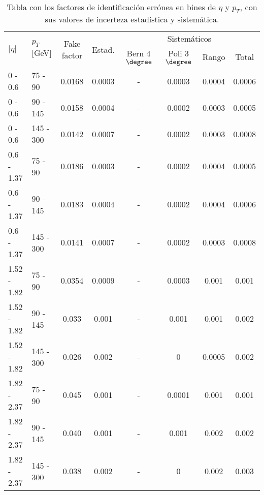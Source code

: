 \begin{table}	
\centering
\begin{threeparttable}
\caption{Tabla con los factores de identificación errónea en bines de $\eta$ y $p_{T}$, con sus valores de incerteza estadística y sistemática.}
\begin{tabular}{ l l c c c c c c }

	\hline
	\hline

	\multirow{2}{*}{$|\eta|$} & \multirow{2}{*}{$p_{T}$[GeV]} & \multirow{2}{*}{Fake factor} & \multirow{2}{*}{Estad.} & \multicolumn{4}{c}{Sistemáticos} \\

	\cline{5-8}

	 & & & & Bern 4$\degree$ & Poli 3$\degree$ & Rango & Total \\


	\hline

	0 - 0.6 & 75 - 90 & 0.0168 & 0.0003 & -			& 0.0003  &  0.0004 &  0.0006  \\

	0 - 0.6 & 90 - 145 & 0.0158 & 0.0004 & - 		& 0.0002  &  0.0003 &  0.0005  \\

	0 - 0.6 & 145 - 300 & 0.0142 & 0.0007 & -  		& 0.0002  &  0.0003 &  0.0008  \\

	\hline

	0.6 - 1.37 & 75 - 90 & 0.0186 & 0.0003 & -		& 0.0002  &  0.0004 &  0.0005  \\

	0.6 - 1.37 & 90 - 145 & 0.0183 & 0.0004 & -		& 0.0002  &  0.0004 &  0.0006  \\

	0.6 - 1.37 & 145 - 300 & 0.0141 & 0.0007 & -  	& 0.0002  &  0.0003 &  0.0008  \\

	\hline

	1.52 - 1.82 & 75 - 90 & 0.0354  & 0.0009 & -		& 0.0003  &  0.001 &  0.001  \\

	1.52 - 1.82 & 90 - 145 & 0.033  & 0.001 & -		& 0.001  &  0.001  &  0.002 \\

	1.52 - 1.82 & 145 - 300 & 0.026  & 0.002 & -  	& 0  &  0.0005  &  0.002  \\

	\hline

	1.82 - 2.37 & 75 - 90 & 0.045  & 0.001 & -		& 0.0001  &  0.001 &  0.001  \\

	1.82 - 2.37 & 90 - 145 & 0.040  & 0.001 & -		& 0.001  &  0.002  &  0.002  \\

	1.82 - 2.37 & 145 - 300 & 0.038  & 0.002 & -  	& 0  &  0.002  &  0.003  \\

	\hline
	\hline

\end{tabular}
\label{ta:fftable}
\end{threeparttable}
\end{table}


